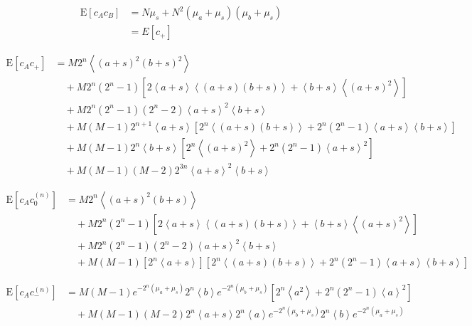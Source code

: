 \documentclass{article}
\begin{document}
\begin{align}
    \mathrm{E}[c_A c_B]
        & = N \mu_s + N^2 (\mu_a + \mu_s)(\mu_b + \mu_s) \\
        & = E[c_+] \nonumber
\end{align}


\begin{align}
    \mathrm{E}[c_A c_+]
        & = M 2^n \left<(a+s)^2 (b+s)^2\right> \nonumber \\
        & \quad + M 2^n (2^n-1) \left[ 2\left<a+s\right>\left<(a+s)(b+s)\right> + \left<b+s\right>\left<(a+s)^2\right>\right] \nonumber \\
        & \quad + M 2^n (2^n-1) (2^n-2) \left<a+s\right>^2 \left<b+s\right> \nonumber \\
        & \quad + M (M-1) 2^{n+1} \left<a+s\right> \left[ 2^n\left<(a+s)(b+s)\right> + 2^n(2^n-1)\left<a+s\right>\left<b+s\right>\right] \nonumber \\
        & \quad + M (M-1) 2^{n} \left<b+s\right> \left[ 2^n\left<(a+s)^2\right> + 2^n(2^n-1)\left<a+s\right>^2\right] \nonumber \\
        & \quad + M (M-1) (M-2) 2^{3n} \left<a+s\right>^2 \left<b+s\right>
\end{align}


\begin{align}
    \mathrm{E}[c_A c_0^{(n)}]
        & = M 2^n \left<(a+s)^2(b+s)\right> \nonumber \\
        & \quad + M 2^n (2^n-1) \left[ 2\left<a+s\right>\left<(a+s)(b+s)\right> + \left<b+s\right>\left<(a+s)^2\right> \right] \nonumber \\
        & \quad + M 2^n (2^n-1) (2^n-2) \left<a+s\right>^2 \left<b+s\right> \nonumber \\
        & \quad + M (M-1) [2^n \left<a+s\right>] [2^n \left<(a+s)(b+s)\right> + 2^n (2^n-1) \left<a+s\right>\left<b+s\right>]
\end{align}


\begin{align}
    \mathrm{E}[c_A c_{-}^{(n)}]
        & = M (M-1) e^{-2^n(\mu_a + \mu_s)} 2^n \left<b\right> e^{-2^n(\mu_b+\mu_s)} [ 2^n\left<a^2\right> + 2^n (2^n-1)\left<a\right>^2 ] \nonumber \\
        & \quad + M (M-1) (M-2) 2^n \left<a+s\right> 2^n \left<a\right> e^{-2^n(\mu_b+\mu_s)} 2^n \left<b\right> e^{-2^n(\mu_a+\mu_s)}
\end{align}
\end{document}
